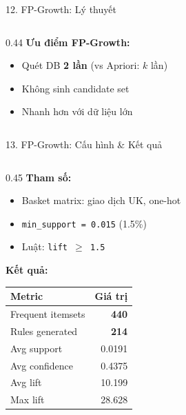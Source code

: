 \documentclass[10pt, aspectratio=169]{beamer}
\begin{document}
\begin{frame}{12. FP-Growth: Lý thuyết}
\begin{columns}[T]
\begin{column}{0.44\textwidth}
            \vspace{0.1cm}
            \textbf{Ưu điểm FP-Growth:}
            \begin{itemize}
                \item Quét DB \textbf{2 lần} (vs Apriori: $k$ lần)
                \item Không sinh candidate set
                \item Nhanh hơn với dữ liệu lớn
            \end{itemize}
        \end{column}
    \end{columns}
\end{frame}

\begin{frame}{13. FP-Growth: Cấu hình \& Kết quả}
    \small
    \begin{columns}[T]
        \begin{column}{0.45\textwidth}
            \textbf{Tham số:}
            \begin{itemize}
                \item Basket matrix: giao dịch UK, one-hot
                \item \texttt{min\_support = 0.015} (1.5\%)
                \item Luật: \texttt{lift $\geq$ 1.5}
            \end{itemize}
            
            \vspace{0.15cm}
            \textbf{Kết quả:}
            
            \begin{tabularx}{\linewidth}{Xr}
                \toprule
                \textbf{Metric} & \textbf{Giá trị} \\
                \midrule
                Frequent itemsets & \textbf{440} \\
                Rules generated & \textbf{214} \\
                Avg support & 0.0191 \\
                Avg confidence & 0.4375 \\
                Avg lift & 10.199 \\
                Max lift & 28.628 \\
                \bottomrule
            \end{tabularx}
        \end{column}
        

\end{columns}
\end{frame}
\end{document}
